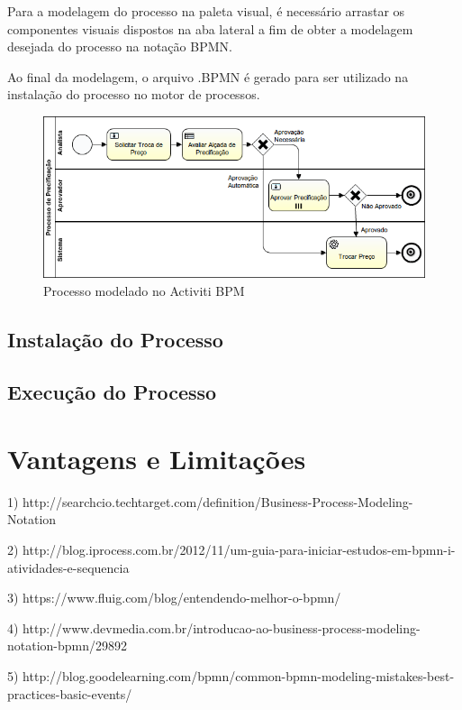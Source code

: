 Para a modelagem do processo na paleta visual, é necessário arrastar os componentes visuais dispostos na aba lateral a fim de obter a modelagem desejada do processo na notação BPMN.

Ao final da modelagem, o arquivo .BPMN é gerado para ser utilizado na instalação do processo no motor de processos.

\begin{figure}[H]
\centering
\includegraphics[width=1.0\textwidth]{imagens/ProcessoDePrecificacao}
\caption{Processo modelado no Activiti BPM}
\label{fig:processo_precificacao}
\end{figure}

\subsection{Instalação do Processo}\label{sec:activiti-automatizar_processo_modelagem}

\subsection{Execução do Processo}\label{sec:activiti-automatizar_processo_modelagem}

\section{Vantagens e Limitações}\label{sec:activiti-vantages_limitacoes}


1) http://searchcio.techtarget.com/definition/Business-Process-Modeling-Notation

2) http://blog.iprocess.com.br/2012/11/um-guia-para-iniciar-estudos-em-bpmn-i-atividades-e-sequencia

3) https://www.fluig.com/blog/entendendo-melhor-o-bpmn/

4) http://www.devmedia.com.br/introducao-ao-business-process-modeling-notation-bpmn/29892

5) http://blog.goodelearning.com/bpmn/common-bpmn-modeling-mistakes-best-practices-basic-events/
